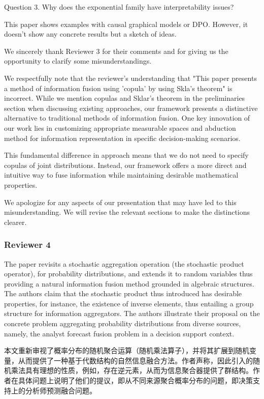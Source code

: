\documentclass[letterpaper]{article} %
\begin{document}
\begin{CJK*}{UTF8}{gbsn}
Question 3. Why does the exponential family have interpretability issues?

This paper shows examples with causal graphical models or DPO. However, it doesn't show any concrete results but a sketch of ideas.



We sincerely thank Reviewer 3 for their comments and for giving us the opportunity to clarify some misunderstandings.

We respectfully note that the reviewer's understanding that "This paper presents a method of information fusion using 'copula' by using Skla's theorem" is incorrect. While we mention copulas and Sklar's theorem in the preliminaries section when discussing existing approaches, our framework presents a distinctive alternative to traditional methods of information fusion. One key innovation of our work lies in customizing appropriate measurable spaces and abduction method for information representation in specific decision-making scenarios.

This fundamental difference in approach means that we do not need to specify copulas of joint distributions. Instead, our framework offers a more direct and intuitive way to fuse information while maintaining desirable mathematical properties.

We apologize for any aspects of our presentation that may have led to this misunderstanding. We will revise the relevant sections to make the distinctions clearer.



\subsubsection{Reviewer 4}

The paper revisits a stochastic aggregation operation (the stochastic product operator), for probability distributions, and extends it to random variables thus providing a natural information fusion method grounded in algebraic structures. The authors claim that the stochastic product thus introduced has desirable properties, for instance, the existence of inverse elements, thus entailing a group structure for information aggregators. The authors illustrate their proposal on the concrete problem aggregating probability distributions from diverse sources, namely, the analyst forecast fusion problem in a decision support context.

本文重新审视了概率分布的随机聚合运算（随机乘法算子），并将其扩展到随机变量，从而提供了一种基于代数结构的自然信息融合方法。作者声称，因此引入的随机乘法具有理想的性质，例如，存在逆元素，从而为信息聚合器提供了群结构。作者在具体问题上说明了他们的提议，即从不同来源聚合概率分布的问题，即决策支持上的分析师预测融合问题。


\end{CJK*}
\end{document}
